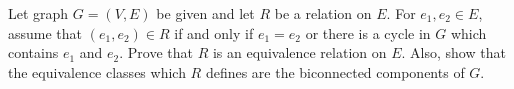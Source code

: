 Let graph $G=(V,E)$ be given and let $R$ be a relation on $E$. For 
$e_{1},e_{2} \in  E$, assume that $(e_{1},e_{2}) \in  R$ if and only if 
$e_{1}=e_{2}$ or
there is a cycle in $G$ which contains $e_{1}$ and $e_{2}$.  Prove that
$R$ is an equivalence relation on $E$.  Also, show that the equivalence
classes which $R$ defines are the biconnected components of $G$.
